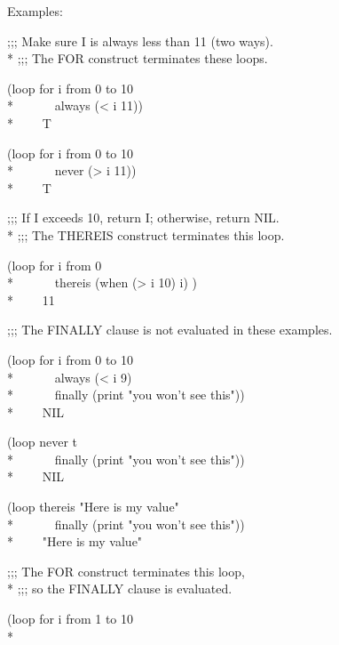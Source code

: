 \begin{defloop}
Examples:
\begin{lisp}
;;; Make sure I is always less than 11 (two ways). \\*
;;; The FOR construct terminates these loops.
\end{lisp}
\begin{lisp}
(loop for i from 0 to 10 \\*
~~~~~~always (< i 11)) \\*
~~~\EV~T
\end{lisp}
\begin{lisp}
(loop for i from 0 to 10 \\*
~~~~~~never (> i 11)) \\*
~~~\EV~T
\end{lisp}
\begin{lisp}
;;; If I exceeds 10, return I; otherwise, return NIL. \\*
;;; The THEREIS construct terminates this loop.
\end{lisp}
\begin{lisp}
(loop for i from 0 \\*
~~~~~~thereis (when (> i 10) i) ) \\*
~~~\EV~11
\end{lisp}
\begin{lisp}
;;; The FINALLY clause is not evaluated in these examples.
\end{lisp}
\begin{lisp}
(loop for i from 0 to 10 \\*
~~~~~~always (< i 9) \\*
~~~~~~finally (print "you won't see this")) \\*
~~~\EV~NIL
\end{lisp}
\begin{lisp}
(loop never t \\*
~~~~~~finally (print "you won't see this")) \\*
~~~\EV~NIL
\end{lisp}
\begin{lisp}
(loop thereis "Here is my value" \\*
~~~~~~finally (print "you won't see this")) \\*
~~~\EV~"Here is my value"
\end{lisp}
\begin{lisp}
;;; The FOR construct terminates this loop, \\*
;;; so the FINALLY clause is evaluated.
\end{lisp}
\begin{lisp}
(loop for i from 1 to 10 \\*

\end{lisp}
\end{defloop}
